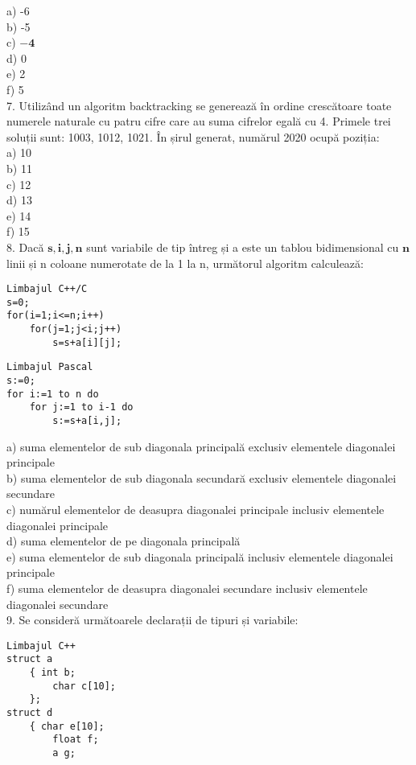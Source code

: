 a) -6\\
b) -5\\
c) $\mathbf{- 4}$\\
d) 0\\
e) 2\\
f) 5\\
7. Utilizând un algoritm backtracking se generează în ordine crescătoare toate numerele naturale cu patru cifre care au suma cifrelor egală cu 4. Primele trei soluții sunt: 1003, 1012, 1021. În șirul generat, numărul 2020 ocupă poziția:\\
a) 10\\
b) 11\\
c) 12\\
d) 13\\
e) 14\\
f) 15\\
8. Dacă $\mathbf{s}, \mathbf{i}, \mathbf{j}, \mathbf{n}$ sunt variabile de tip întreg și a este un tablou bidimensional cu $\mathbf{n}$ linii și n coloane numerotate de la 1 la n, următorul algoritm calculează:

\begin{verbatim}
Limbajul C++/C
s=0;
for(i=1;i<=n;i++)
    for(j=1;j<i;j++)
        s=s+a[i][j];
\end{verbatim}

\begin{verbatim}
Limbajul Pascal
s:=0;
for i:=1 to n do
    for j:=1 to i-1 do
        s:=s+a[i,j];
\end{verbatim}

a) suma elementelor de sub diagonala principală exclusiv elementele diagonalei principale\\
b) suma elementelor de sub diagonala secundară exclusiv elementele diagonalei secundare\\
c) numărul elementelor de deasupra diagonalei principale inclusiv elementele diagonalei principale\\
d) suma elementelor de pe diagonala principală\\
e) suma elementelor de sub diagonala principală inclusiv elementele diagonalei principale\\
f) suma elementelor de deasupra diagonalei secundare inclusiv elementele diagonalei secundare\\
9. Se consideră următoarele declarații de tipuri și variabile:

\begin{verbatim}
Limbajul C++
struct a
    { int b;
        char c[10];
    };
struct d
    { char e[10];
        float f;
        a g;
\end{verbatim}

